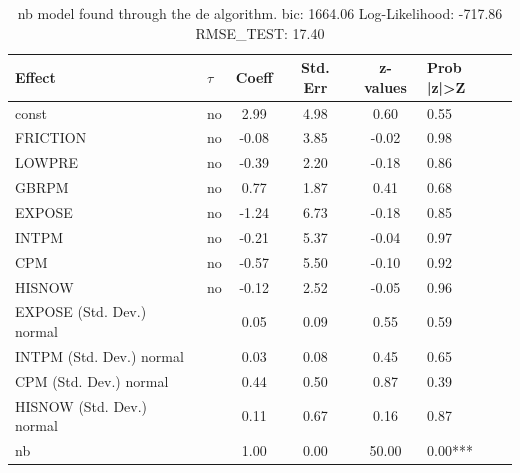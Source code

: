 \begin{table}
	\caption{nb model found through the de algorithm. bic: 1664.06 Log-Likelihood: -717.86 RMSE_TEST: 17.40}
	\begin{center}
		\begin{tabular}{|l|l|c|c|c|l|}
			\hline
			Effect & $\tau$ & Coeff & Std. Err & z-values & Prob |z|>Z \\
			\hline
			const & no & 2.99 & 4.98 & 0.60 & 0.55 \\
			\hline
			FRICTION & no & -0.08 & 3.85 & -0.02 & 0.98 \\
			\hline
			LOWPRE & no & -0.39 & 2.20 & -0.18 & 0.86 \\
			\hline
			GBRPM & no & 0.77 & 1.87 & 0.41 & 0.68 \\
			\hline
			EXPOSE & no & -1.24 & 6.73 & -0.18 & 0.85 \\
			\hline
			INTPM & no & -0.21 & 5.37 & -0.04 & 0.97 \\
			\hline
			CPM & no & -0.57 & 5.50 & -0.10 & 0.92 \\
			\hline
			HISNOW & no & -0.12 & 2.52 & -0.05 & 0.96 \\
			\hline
			EXPOSE (Std. Dev.) normal &  & 0.05 & 0.09 & 0.55 & 0.59 \\
			\hline
			INTPM (Std. Dev.) normal &  & 0.03 & 0.08 & 0.45 & 0.65 \\
			\hline
			CPM (Std. Dev.) normal &  & 0.44 & 0.50 & 0.87 & 0.39 \\
			\hline
			HISNOW (Std. Dev.) normal &  & 0.11 & 0.67 & 0.16 & 0.87 \\
			\hline
			nb &  & 1.00 & 0.00 & 50.00 & 0.00*** \\
			\hline
		\end{tabular}
	\end{center}
\end{table}